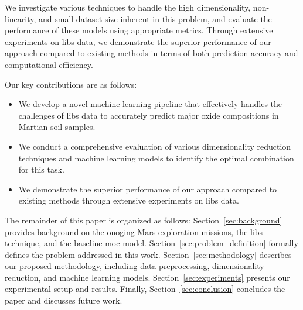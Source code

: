 We investigate various techniques to handle the high dimensionality, non-linearity, and small dataset size inherent in this problem, and evaluate the performance of these models using appropriate metrics. 
Through extensive experiments on \gls{libs} data, we demonstrate the superior performance of our approach compared to existing methods in terms of both prediction accuracy and computational efficiency.

Our key contributions are as follows:
\begin{itemize}
    \item We develop a novel machine learning pipeline that effectively handles the challenges of \gls{libs} data to accurately predict major oxide compositions in Martian soil samples.
    \item We conduct a comprehensive evaluation of various dimensionality reduction techniques and machine learning models to identify the optimal combination for this task. 
	\item We demonstrate the superior performance of our approach compared to existing methods through extensive experiments on \gls{libs} data.
\end{itemize}

The remainder of this paper is organized as follows: 
Section~\ref{sec:background} provides background on the onoging Mars exploration missions, the \gls{libs} technique, and the baseline \gls{moc} model. 
Section~\ref{sec:problem_definition} formally defines the problem addressed in this work.
Section~\ref{sec:methodology} describes our proposed methodology, including data preprocessing, dimensionality reduction, and machine learning models. 
Section~\ref{sec:experiments} presents our experimental setup and results.
Finally, Section~\ref{sec:conclusion} concludes the paper and discusses future work.

